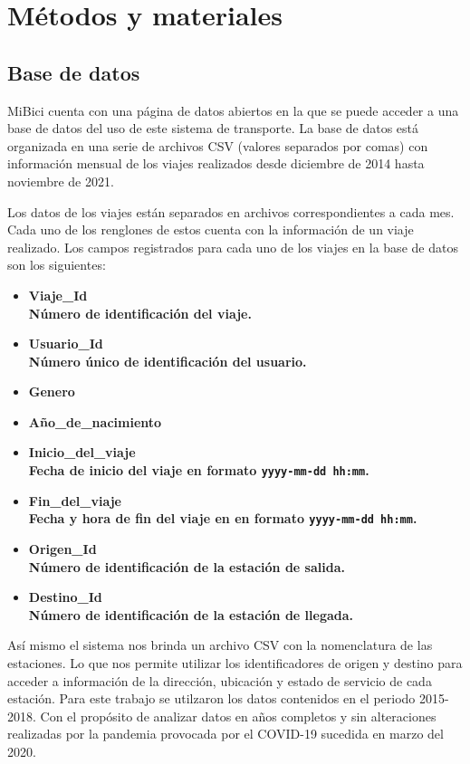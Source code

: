 \section{Métodos y materiales}

\subsection{Base de datos}

MiBici cuenta con una página de datos abiertos en la que se puede acceder a una base de datos del uso de este sistema de transporte\cite{mibici_data}. La base de datos está organizada en una serie de archivos CSV (valores separados por comas) con información mensual de los viajes realizados desde diciembre de 2014 hasta noviembre de 2021.

Los datos de los viajes están separados en archivos correspondientes a cada mes. Cada uno de los renglones de estos cuenta con la información de un viaje realizado. Los campos registrados para cada uno de los viajes en la base de datos son los siguientes:

\begin{itemize}
    \item \bfseries{Viaje\_Id }\normalfont \\ Número de identificación del viaje.
    \item \bfseries{Usuario\_Id }\normalfont\\ Número único de identificación del usuario.
    \item \bfseries{Genero }\normalfont
    \item \bfseries{Año\_de\_nacimiento }
    \item \bfseries{Inicio\_del\_viaje} \normalfont \\ Fecha de inicio del viaje en formato \lstinline|yyyy-mm-dd hh:mm|.
    \item \bfseries{Fin\_del\_viaje }\normalfont \\ Fecha y hora de fin del viaje en en formato \lstinline|yyyy-mm-dd hh:mm|.
    \item \bfseries{Origen\_Id }\normalfont \\ Número de identificación de la estación de salida.
    \item \bfseries{Destino\_Id }\normalfont \\ Número de identificación de la estación de llegada.
\end{itemize}

Así mismo el sistema nos brinda un archivo CSV con la nomenclatura de las estaciones. Lo que nos permite utilizar los identificadores de origen y destino para acceder a información de la dirección, ubicación y estado de servicio de cada estación. Para este trabajo se utilzaron los datos contenidos en el periodo 2015-2018. Con el propósito de analizar datos en años completos y sin alteraciones realizadas por la pandemia provocada por el COVID-19 sucedida en marzo del 2020.

